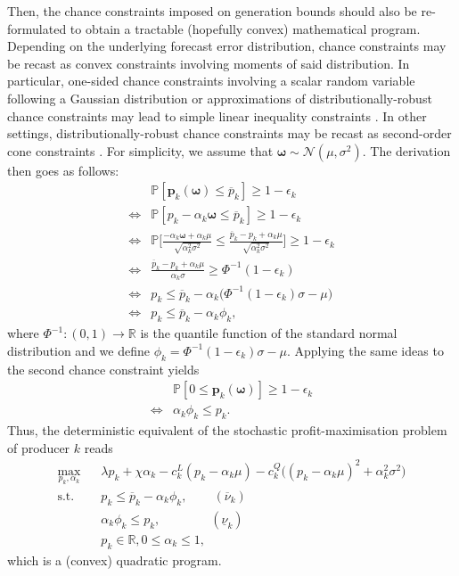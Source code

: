 \documentclass{article}
\begin{document}
Then, the chance constraints imposed on generation bounds should also be re-formulated to obtain a tractable (hopefully convex) mathematical program. Depending on the underlying forecast error distribution, chance constraints may be recast as convex constraints involving moments of said distribution. In particular, one-sided chance constraints involving a scalar random variable following a Gaussian distribution or approximations of distributionally-robust chance constraints may lead to simple linear inequality constraints \cite{Dvorkin2020}. In other settings, distributionally-robust chance constraints may be recast as second-order cone constraints \cite{Xie2018}. For simplicity, we assume that $\boldsymbol{\omega} \sim \mathcal{N}(\mu, \sigma^2)$. The derivation then goes as follows:
\begin{align*}
&\mathbb{P}[\mathbf{p}_k(\boldsymbol{\omega}) \le \overline{p}_k] \ge 1 - \epsilon_k\\
\Leftrightarrow &\mathbb{P}[p_k - \alpha_k \boldsymbol{\omega} \le \overline{p}_k] \ge 1 - \epsilon_k\\
\Leftrightarrow &\mathbb{P}\Big[\frac{- \alpha_k \boldsymbol{\omega} + \alpha_k \mu}{\sqrt{\alpha_k^2 \sigma^2}} \le \frac{\overline{p}_k - p_k + \alpha_k \mu}{\sqrt{\alpha_k^2 \sigma^2}}\Big] \ge 1 - \epsilon_k\\
\Leftrightarrow &\frac{\overline{p}_k - p_k + \alpha_k \mu}{\alpha_k \sigma} \ge \Phi^{-1}(1 - \epsilon_k)\\
\Leftrightarrow &p_k \le \overline{p}_k - \alpha_k \big(\Phi^{-1}(1 - \epsilon_k)\sigma - \mu\big)\\
\Leftrightarrow &p_k \le \overline{p}_k - \alpha_k \phi_k,
\end{align*}
where $\Phi^{-1}: (0, 1) \rightarrow \mathbb{R}$ is the quantile function of the standard normal distribution and we define $\phi_k = \Phi^{-1}(1 - \epsilon_k)\sigma - \mu$. Applying the same ideas to the second chance constraint yields
\begin{align*}
&\mathbb{P}[0 \le \mathbf{p}_k(\boldsymbol{\omega})] \ge 1 - \epsilon_k\\
\Leftrightarrow & \alpha_k \phi_k \le p_k.
\end{align*}
Thus, the deterministic equivalent of the stochastic profit-maximisation problem of producer $k$ reads
\begin{align}
\underset{p_k, \alpha_k}{\max} \hspace{10pt} & \lambda p_k + \chi \alpha_k - c_k^L(p_k - \alpha_k \mu) - c_k^Q \big((p_k - \alpha_k \mu)^2 + \alpha_k^2 \sigma^2\big)\\
\mbox{s.t. } & p_k \le \overline{p}_k - \alpha_k \phi_k, \hspace{25pt} (\overline{\nu}_k)\\
& \alpha_k \phi_k \le p_k, \hspace{48pt}(\underline{\nu}_k)\\
&p_k \in \mathbb{R}, 0 \le \alpha_k \le 1,
\end{align}
which is a (convex) quadratic program.
\end{document}
